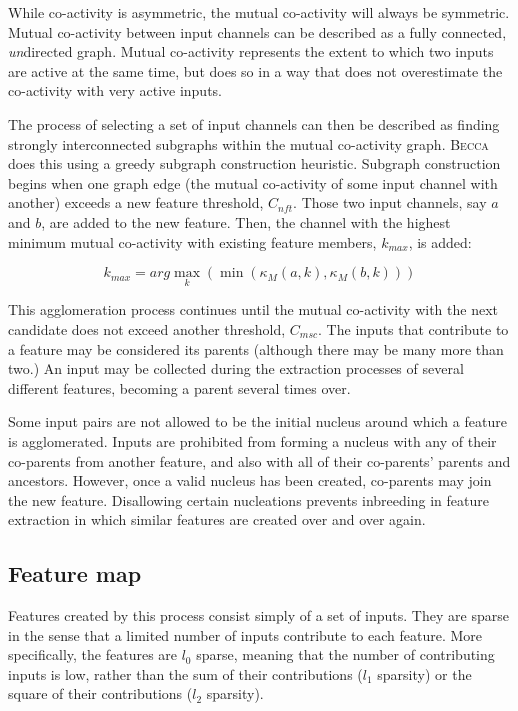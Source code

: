 While co-activity is asymmetric, the mutual co-activity will always be symmetric. Mutual co-activity between input channels can be described as a fully connected, {\em un}directed graph. Mutual co-activity represents the extent to which two inputs are active at the same time, but does so in a way that does not overestimate the co-activity with very active inputs.

The process of selecting a set of input channels can then be described as finding strongly interconnected subgraphs within the mutual co-activity graph. \textsc{Becca} does this using a greedy subgraph construction heuristic. Subgraph construction begins when one graph edge (the mutual co-activity of some input channel with another) exceeds a new feature threshold, $C_{nft}$. Those two input channels, say $a$ and $b$, are added to the new feature. Then, the channel with the highest minimum mutual co-activity with existing feature members, $k_{max}$, is added:

\begin{equation}
k_{max} = arg \max_k (\min(\kappa_M(a,k), \kappa_M(b, k)))
\end{equation}

This agglomeration process continues until the mutual co-activity with the next candidate does not exceed another threshold, $C_{msc}$.  The inputs that contribute to a feature may be considered its parents (although there may be many more than two.) An input may be collected during the extraction processes of several different features, becoming a parent several times over. 

Some input pairs are not allowed to be the initial nucleus around which a feature is agglomerated. Inputs are prohibited from forming a nucleus with any of their co-parents from another feature, and also with all of their co-parents' parents and ancestors. However, once a valid nucleus has been created, co-parents may join the new feature. Disallowing certain nucleations prevents inbreeding in feature extraction in which similar features are created over and over again. 

\subsection{Feature map}

Features created by this process consist simply of a set of inputs. They are sparse in the sense that a limited number of inputs contribute to each feature. More specifically, the features are $l_0$ sparse, meaning that the number of contributing inputs is low, rather than the sum of their contributions ($l_1$ sparsity) or the square of their contributions ($l_2$ sparsity).

